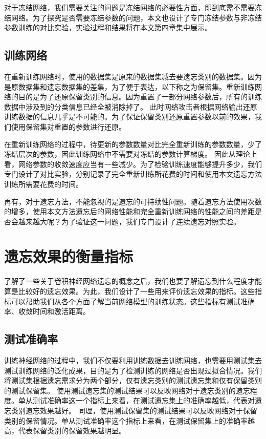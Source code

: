 对于冻结网络，我们需要关注的问题是冻结网络的必要性方面，即到底需不需要冻结网络。为了探究是否需要冻结参数的问题，本文也设计了专门冻结参数与非冻结参数训练的对比实验，实验过程和结果将在本文第四章集中展示。

\subsection{训练网络}

在重新训练网络时，使用的数据集是原来的数据集减去要遗忘类别的数据集。因为是原数据集和遗忘数据集的差集，为了便于表达，以下称之为保留集。重新训练网络的目的是为了还原保留类别的信息。因为重置了一部分网络参数后，所有的训练数据中涉及到的分类信息已经全被消除掉了。
此时网络攻击者根据网络输出还原训练数据的信息几乎是不可能的。为了保证保留类别还原重置参数以前的效果，我们使用保留集对重置的参数进行还原。

在重新训练网络的过程中，待更新的参数数量对比完全重新训练的参数数量，少了冻结层次的参数，因此训练网络中不需要对冻结的参数计算梯度。
因此从理论上看，网络参数的收敛速度应当有一些减少。为了检验训练速度能够提升多少，我们专门设计了对比实验，分别记录了完全重新训练所花费的时间和使用本文遗忘方法训练所需要花费的时间。

再有，对于遗忘方法，不能忽视的是遗忘的可持续性问题。随着遗忘方法使用次数的增多，使用本文方法遗忘后的网络性能和完全重新训练网络的性能之间的差距是否会越来越大呢？为了验证这一问题，我们专门设计了连续遗忘对照实验。

\section{遗忘效果的衡量指标} \label{forget_evaluation_index}

了解了一些关于卷积神经网络遗忘的概念之后，我们也要了解遗忘到什么程度才能算是比较好的遗忘效果。为此，我们设计了一些用来评价遗忘效果的指标。这些指标可以帮助我们从各个方面了解当前网络模型的训练状态。这些指标有测试准确率、收敛时间和激活距离。
\subsection{测试准确率}

训练神经网络的过程中，我们不仅要利用训练数据去训练网络，也需要用测试集去测试训练网络的泛化成果，目的是为了检测训练的网络是否出现过拟合情况。我们将测试集根据遗忘需求分为两个部分，仅有遗忘类别的测试遗忘集和仅有保留类别的测试保留集。
使用测试遗忘集的测试结果可以反映网络对于遗忘类别的遗忘程度。单从测试准确率这一个指标上来看，在测试遗忘集上的准确率越低，代表对遗忘类别遗忘效果越好。
同理，使用测试保留集的测试结果可以反映网络对于保留类别的保留情况。单从测试准确率这个指标上来看，在测试保留集上的准确率越高，代表保留类别的保留效果越明显。

